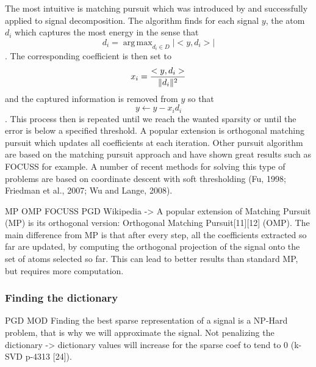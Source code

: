 \documentclass[a4paper,11pt]{article}
\DeclarePairedDelimiter\norm{\lVert}{\rVert} %
\DeclareMathOperator*{\argmax}{arg\,max} %
\begin{document}
The most intuitive is matching pursuit which was introduced by \cite{mallat93} and successfully applied to signal decomposition.
The algorithm finds for each signal $y$, the atom $d_i$ which captures the most energy in the sense that
$$d_i = \argmax_{d_i \in D} |<y, d_i>|$$.
The corresponding coefficient is then set to $$x_i = \frac{<y, d_i>}{\norm{d_i}^2}$$ and the captured information is removed from $y$ so that $$y \leftarrow y - x_i d_i$$.
This process then is repeated until we reach the wanted sparsity or until the error is below a specified threshold.
A popular extension is orthogonal matching pursuit which updates all coefficients at each iteration.
Other pursuit algorithm are based on the matching pursuit approach and have shown great results such as FOCUSS for example.
A number of recent methods for solving this type of problems are based on coordinate
descent with soft thresholding (Fu, 1998; Friedman et al., 2007; Wu and Lange, 2008).

MP OMP FOCUSS \cite{gorodnitsky97} PGD
Wikipedia -> A popular extension of Matching Pursuit (MP) is its orthogonal version: Orthogonal Matching Pursuit[11][12] (OMP). The main difference from MP is that after every step, all the coefficients extracted so far are updated, by computing the orthogonal projection of the signal onto the set of atoms selected so far. This can lead to better results than standard MP, but requires more computation.
\subsubsection{Finding the dictionary}
PGD MOD
Finding the best sparse representation of a signal is a NP-Hard problem, that is why we will approximate the signal.
Not penalizing the dictionary -> dictionary values will increase for the sparse coef to tend to 0
\cite{olshausen97} (k-SVD p-4313 [24]).
\end{document}
